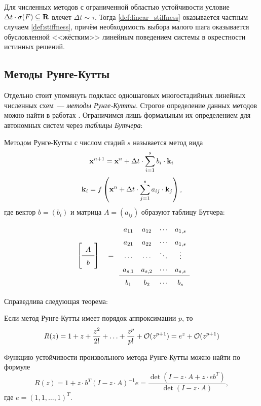 Для численных методов с ограниченной областью устойчивости условие $ \Delta t \cdot \sigma(F) \subseteq \mathbf{R} $ влечет $ \Delta t \sim \tau $.
Тогда \ref{def:linear_stiffness} оказывается частным случаем \ref{def:stiffness},
причём необходимость выбора малого шага оказывается обусловленной <<жёстким>> линейным поведением системы в окрестности истинных решений.


\subsection{Методы Рунге-Кутты}
\label{subsec:Runge-Kutta}

Отдельно стоит упомянуть подкласс одношаговых многостадийных линейных численных схем~--- \emph{методы Рунге-Кутты}.
Строгое определение данных методов можно найти в работах \cite{lambert1991methods, heirer1999solvingode2}.
Ограничимся лишь формальным их определением для автономных систем через \emph{таблицы Бутчера}:
\begin{definition}
    Методом Рунге-Кутты с числом стадий $ s $ называется метод вида
    \[
        \mathbf{x}^{n+1} = \mathbf{x}^n + \Delta t \cdot \sum_{i = 1}^s b_i \cdot \mathbf{k}_i
    \]
    \[
        \mathbf{k}_i = f\left( \mathbf{x}^n + \Delta t \cdot \sum_{j = 1}^s a_{ij} \cdot \mathbf{k}_j \right),
    \]
    где вектор $ b = (b_i) $ и матрица $ A = (a_{ij}) $ образуют таблицу Бутчера:
    \[
        \def\arraystretch{1.5}
        \left[
            \begin{array}{c}
                A \\
                \hline
                b
            \end{array}
        \right]
        \quad
        =
        \quad
        \begin{matrix}
            a_{11} & a_{12} & \cdots & a_{1,s}   \\
            a_{21} & a_{22} & \cdots & a_{1,s}   \\
            \cdots & \cdots & \ddots & \vdots    \\
            a_{s,1} & a_{s,2} & \cdots & a_{s,s} \\
            \hline
            b_{1} & b_{2} & \cdots & b_{s} \\
        \end{matrix}
    \]
\end{definition}

Справедлива \cite{heirer1999solvingode2} следующая теорема:
\begin{theorem}
    Если метод Рунге-Кутты имеет порядок аппроксимации $ p $, то
    \[
        R(z) = 1 + z + \frac{z^2}{2!} + \ldots + \frac{z^p}{p!} + \mathcal{O}(z^{p+1}) = e^z + \mathcal{O}(z^{p+1})
    \]
\end{theorem}

\begin{statement}
    Функцию устойчивости произвольного метода Рунге-Кутты можно найти по формуле
    \begin{equation}
        \label{eq:Runge-Kutta}
        R(z) = 1 + z \cdot b^T (I - z \cdot A)^{-1} e = \frac{\det \left( I - z \cdot A + z \cdot e b^T \right)}{\det \left( I - z \cdot A \right)},
    \end{equation}
    где $ e = (1, 1, \ldots, 1)^T $.
\end{statement}
